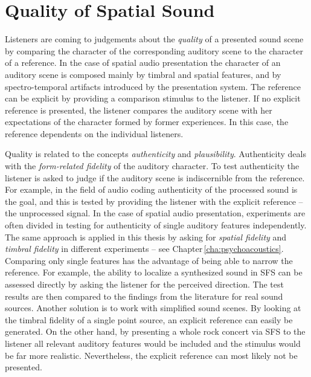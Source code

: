 \section{Quality of Spatial Sound}
\label{sec:quality_of_spatial_sound}
%
Listeners are coming to judgements about the \emph{quality} of a
presented sound scene by
comparing the character of the corresponding auditory scene to the character of
a reference.\autocite{Blauert2003}
In the case of spatial audio presentation the character of an auditory scene is
composed mainly by timbral and spatial features, and by spectro-temporal
artifacts introduced by the presentation system.\autocite{Rumsey2002a}
The reference can be explicit by providing a comparison stimulus to the
listener. If no explicit reference is presented, the listener compares the
auditory scene with her expectations of the character formed by former
experiences. In this case,
the reference dependents on the individual listeners.

Quality is related to the concepts \emph{authenticity} and
\emph{plausibility}.
Authenticity deals with the \emph{form-related fidelity}
of the auditory character. To
test authenticity the listener is asked to judge if the auditory scene is
indiscernible from the reference.
For example, in the field of audio coding authenticity of the processed sound is
the goal, and this is tested by providing the listener with the explicit reference --
the unprocessed signal.
In the case of spatial audio presentation, experiments are often divided in
testing for authenticity of single auditory features independently.\autocite[E.g.][]{Rumsey2005}
The same approach is applied in
this thesis by asking for \emph{spatial fidelity} and \emph{timbral fidelity}
in different experiments -- see Chapter\,\ref{cha:psychoacoustics}.
Comparing only single features has the advantage of being able to narrow the
reference. For example, the ability to localize a synthesized sound in \ac{SFS}
can be assessed directly by asking the listener for the perceived direction.
The test results are then compared to the findings from the literature for
real sound sources.
Another solution is to work with simplified sound scenes. By looking at the timbral
fidelity of a single point source, an explicit reference can easily be generated.
On the other hand, by presenting a whole rock concert via \ac{SFS} to the
listener all relevant auditory features would be included and the stimulus would
be far more realistic. Nevertheless, the explicit reference can most likely
not be presented.

